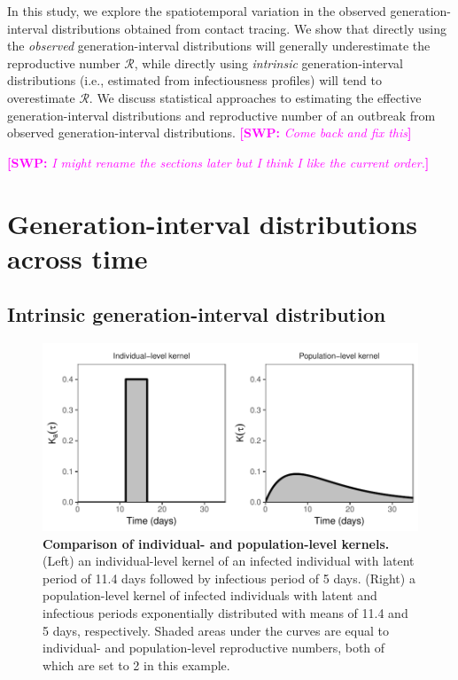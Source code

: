 \documentclass[12pt]{article}
\newcommand{\RR}{\ensuremath{{\mathcal R}}}
\newcommand{\comment}[3]{\textcolor{#1}{\textbf{[#2: }\textsl{#3}\textbf{]}}}
\newcommand{\swp}[1]{\comment{magenta}{SWP}{#1}}
\begin{document}
In this study, we explore the spatiotemporal variation in the observed generation-interval distributions obtained from contact tracing.
We show that directly using the \emph{observed} generation-interval distributions will generally underestimate the reproductive number \RR, while directly using \emph{intrinsic} generation-interval distributions (i.e., estimated from infectiousness profiles) will tend to overestimate \RR.
We discuss statistical approaches to estimating the effective generation-interval distributions and reproductive number of an outbreak from observed generation-interval distributions.
\swp{Come back and fix this}

\swp{I might rename the sections later but I think I like the current order.}
\section{Generation-interval distributions across time}

\subsection{Intrinsic generation-interval distribution}

\begin{figure}[t]
\includegraphics[width=\textwidth]{../fig/individual_and_population.pdf}
\caption{\textbf{Comparison of individual- and population-level kernels.}
(Left) an individual-level kernel of an infected individual with latent period of 11.4 days followed by infectious period of 5 days. 
(Right) a population-level kernel of infected individuals with latent and infectious periods exponentially distributed with means of 11.4 and 5 days, respectively. 
Shaded areas under the curves are equal to individual- and population-level reproductive numbers, both of which are set to 2 in this example.
}
\label{fig:indpop}

\end{figure}
\end{document}
